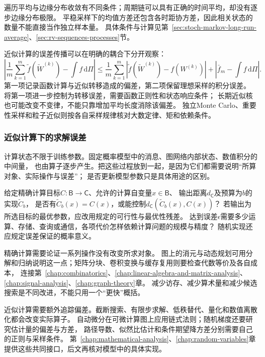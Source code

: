 遍历平均与边缘分布收敛有不同条件；周期链可以具有正确的时间平均，却没有逐步边缘分布极限。
平稳采样下的均值方差还包含各时距协方差，因此相关状态的数量不能直接当作独立样本量。
具体条件与计算见第~\ref{sec:stoch-markov-long-run-average}、\ref{sec:rv-sequences-processes}节。

近似计算的误差传播可以在明确的耦合下分开观察：
\[
  \left|\frac1m\sum_{k=1}^m\widetilde f(\widetilde W^{(k)})-\int f\,\mathrm d\Pi\right|
  \leq\frac1m\sum_{k=1}^m
    |\widetilde f(\widetilde W^{(k)})-f(W^{(k)})|
    +\left|\bar f_m-\int f\,\mathrm d\Pi\right|.
\]
第一项记录函数计算与近似转移造成的偏差，第二项保留理想采样的积分误差。
将第一项进一步控制为转移误差，需要函数正则性和状态响应条件；
长期近似核也可能改变不变律，不能只靠增加平均长度消除该偏差。
独立Monte Carlo、重要性采样和粒子近似则按各自采样规律核对大数定律、矩和依赖条件。

\subsubsection{近似计算下的求解误差}
\label{sec:future-analysis-computation}

计算状态不限于训练参数。固定概率模型中的消息、图网络内部状态、数值积分的中间量，
也由算子逐步产生。把这些过程放到一起，是因为它们都需要说明“所算对象、实际操作与误差”；
是否更新模型参数只是具体用途的区别。

\begin{mathproblem}
  \label{question:future-computation}
  给定精确计算目标$C:\mathsf B\to\mathsf C$、允许的计算自变量$x\in\mathsf B$、
  输出距离$d_{\mathsf C}$及预算为$b$的实现$\widetilde C_b$，
  是否有$\widetilde C_b(x)=C(x)$，或能控制$d_{\mathsf C}(\widetilde C_b(x),C(x))$？
  若输出为所选目标的最优参数，应改用规定的可行性与最优性残差。
  达到误差$\epsilon$需要多少运算、存储、查询或通信，各项代价怎样依赖计算问题的规模与精度？
  随机实现还应规定误差保证的概率意义。
\end{mathproblem}

精确计算需要论证一系列操作没有改变所求对象。
图上的消元与动态规划可用分解和归纳说明这一点；矩阵分块、卷积变换与缓存复用则要检查代数等价及各自成本，
连接第~\ref{chap:combinatorics}、\ref{chap:linear-algebra-and-matrix-analysis}、\ref{chap:signal-analysis}、\ref{chap:graph-theory}章。
减少访存、减少算术量和减少候选搜索是不同改进，不能只用一个“更快”概括。

近似计算需要额外追踪偏差。截断搜索、有限步求解、低秩替代、量化和数值离散化都会改变实际算子。
自动微分在可微计算图上应用链式法则；随机梯度还要研究估计量的偏差与方差，
路径导数、似然比估计和条件期望降方差分别需要自己的正则与采样条件。
第~\ref{chap:mathematical-analysis}、\ref{chap:random-variables}章提供这些共同接口，后文再核对模型中的具体实现。

